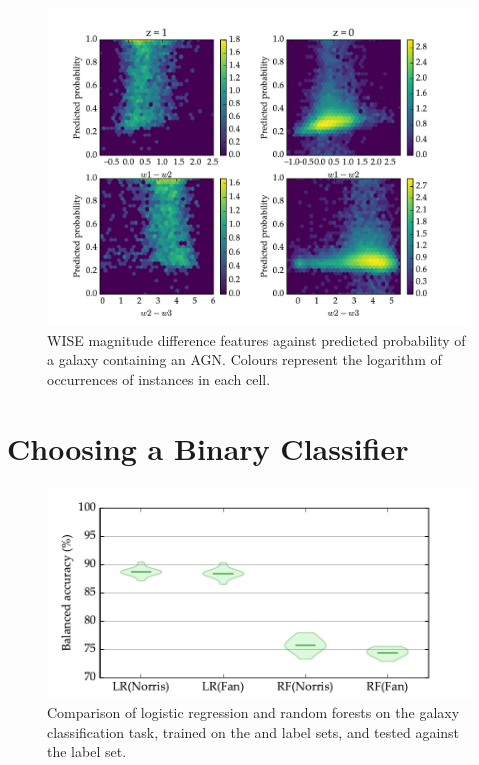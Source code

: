     \begin{figure}
      \centering
      \includegraphics[width=\textwidth]{images/experiments/wise_colours}
      \caption{WISE magnitude difference features against predicted probability
        of a galaxy containing an AGN. Colours represent the logarithm of
        occurrences of instances in each cell.}
      \label{fig:wise-colours}
    \end{figure}

\section{Choosing a Binary Classifier}
\label{sec:binary-classifiers}
  
  \begin{figure}
    \centering
    \includegraphics[width=\textwidth]{images/experiments/lr_rf}
    \caption{Comparison of logistic regression and random forests on the galaxy
      classification task, trained on the \citet{norris06} and \citet{fan15}
      label sets, and tested against the \citet{norris06} label set.}
  \end{figure}

